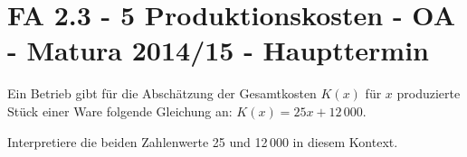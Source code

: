 \section{FA 2.3 - 5 Produktionskosten - OA - Matura 2014/15 - Haupttermin}

\begin{beispiel}[FA 2.3]{1} %
Ein Betrieb gibt für die Abschätzung der Gesamtkosten $K(x)$ für $x$ produzierte Stück einer Ware folgende Gleichung an: $K(x) = 25x + 12\,000$. \leer

Interpretiere die beiden Zahlenwerte 25 und 12\,000 in diesem Kontext.


\end{beispiel}